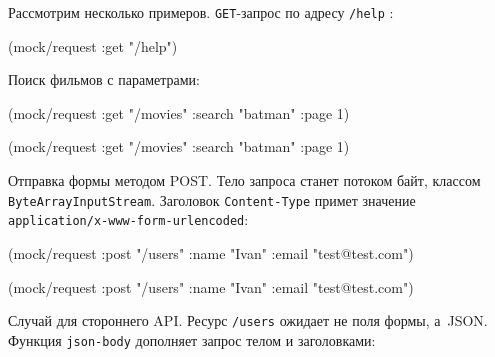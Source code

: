 Рассмотрим несколько примеров. \verb|GET|-запрос по адресу \verb|/help| :

\begin{english}
  \begin{clojure}
(mock/request :get "/help")
  \end{clojure}
\end{english}

\noindent
Поиск фильмов с параметрами:

\ifx\DEVICETYPE\MOBILE

\begin{english}
  \begin{clojure}
(mock/request :get "/movies"
  {:search "batman" :page 1})
  \end{clojure}
\end{english}

\else

\begin{english}
  \begin{clojure}
(mock/request :get "/movies" {:search "batman" :page 1})
  \end{clojure}
\end{english}

\fi


\noindent
Отправка формы методом POST. Тело запроса станет потоком байт, классом
\texttt{ByteArrayInput\-Stream}. Заголовок \verb|Content-Type| примет значение
\verb|application/x-www-form-urlencoded|:

\ifx\DEVICETYPE\MOBILE

\begin{english}
  \begin{clojure}
(mock/request :post "/users"
  {:name "Ivan" :email "test@test.com"})
  \end{clojure}
\end{english}

\else

\begin{english}
  \begin{clojure}
(mock/request :post "/users"
              {:name "Ivan" :email "test@test.com"})
  \end{clojure}
\end{english}

\fi


\noindent
Случай для стороннего API. Ресурс \verb|/users| ожидает не поля формы, а~JSON.
Функция \verb|json-body| дополняет запрос телом и заголовками:

